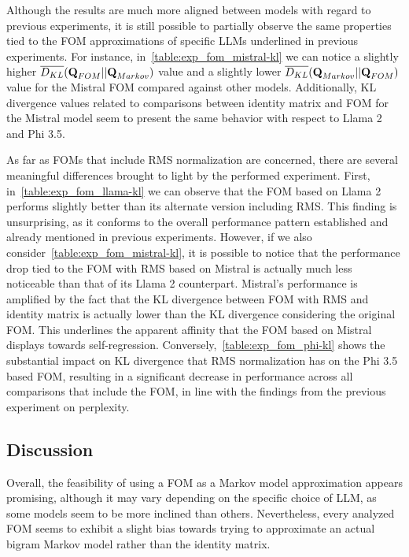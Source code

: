 Although the results are much more aligned between models with regard to previous experiments, it is still possible to partially observe the same properties tied to the FOM approximations of specific LLMs underlined in previous experiments.
For instance, in~\cref{table:exp_fom_mistral-kl} we can notice a slightly higher ${\overline {D_{KL}}}(\bm{\mathbf{Q}}_{FOM} || \bm{\mathbf{Q}}_{Markov})$ value and a slightly lower ${\overline {D_{KL}}}(\bm{\mathbf{Q}}_{Markov} || \bm{\mathbf{Q}}_{FOM})$ value for the Mistral FOM compared against other models.
Additionally, KL divergence values related to comparisons between identity matrix and FOM for the Mistral model seem to present the same behavior with respect to Llama 2 and Phi 3.5.

As far as FOMs that include RMS normalization are concerned, there are several meaningful differences brought to light by the performed experiment.
First, in~\cref{table:exp_fom_llama-kl} we can observe that the FOM based on Llama 2 performs slightly better than its alternate version including RMS\@.
This finding is unsurprising, as it conforms to the overall performance pattern established and already mentioned in previous experiments.
However, if we also consider~\cref{table:exp_fom_mistral-kl}, it is possible to notice that the performance drop tied to the FOM with RMS based on Mistral is actually much less noticeable than that of its Llama 2 counterpart.
Mistral's performance is amplified by the fact that the KL divergence between FOM with RMS and identity matrix is actually lower than the KL divergence considering the original FOM\@.
This underlines the apparent affinity that the FOM based on Mistral displays towards self-regression.
Conversely,~\cref{table:exp_fom_phi-kl} shows the substantial impact on KL divergence that RMS normalization has on the Phi 3.5 based FOM, resulting in a significant decrease in performance across all comparisons that include the FOM, in line with the findings from the previous experiment on perplexity.

\subsection{Discussion}\label{ssec:exp_fom_discussion}

Overall, the feasibility of using a FOM as a Markov model approximation appears promising, although it may vary depending on the specific choice of LLM, as some models seem to be more inclined than others.
Nevertheless, every analyzed FOM seems to exhibit a slight bias towards trying to approximate an actual bigram Markov model rather than the identity matrix.

